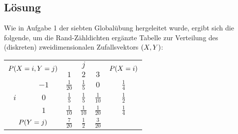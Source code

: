 \documentclass{exercise}
\begin{document}
    \subsection*{Lösung}
    Wie in Aufgabe 1 der siebten Globalübung hergeleitet wurde, ergibt sich die folgende, um die Rand-Zähldichten ergänzte Tabelle zur Verteilung des (diskreten) zweidimensionalen Zufallsvektors \(\parentheses*{X, Y}\):
    \begin{center}
        \begin{tabular}{cccccc}
            \toprule
            \multicolumn{2}{c}{\multirow{2}{*}{\(P\parentheses*{X = i, Y = j}\)}} & \multicolumn{3}{c}{\(j\)} & \multirow{2}{*}{\(P\parentheses*{X = i}\)}\\
            \multicolumn{2}{c}{\multirow{2}{*}{}} & \(1\) & \(2\) & \(3\) & \multirow{2}{*}{}\\
            \midrule
            \multirow{3}{*}{\(i\)} & \(-1\) & \(\frac{1}{20}\) & \(\frac{1}{5}\) & \(0\) & \(\frac{1}{4}\)\\
            & \(0\) & \(\frac{1}{5}\) & \(\frac{1}{5}\) & \(\frac{1}{10}\) & \(\frac{1}{2}\)\\
            & \(1\) & \(\frac{1}{10}\) & \(\frac{1}{10}\) & \(\frac{1}{20}\) & \(\frac{1}{4}\)\\
            \multicolumn{2}{c}{\(P\parentheses*{Y = j}\)} & \(\frac{7}{20}\) & \(\frac{1}{2}\) & \(\frac{3}{20}\) &\\
            \bottomrule
        \end{tabular}
    \end{center}
\end{document}

